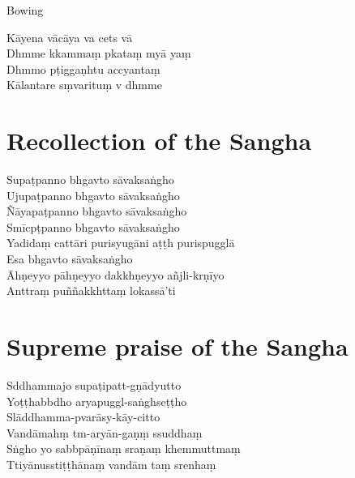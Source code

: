 \clearpage

\begin{instruction}%
  Bowing
\end{instruction}

Kāyena vācāya va cets vā\\
Dhmme kkammaṃ pkataṃ myā yaṃ\\
Dhmmo pṭiggaṇhtu accyantaṃ\\
Kālantare sṃvarituṃ v dhmme

\chapter{Recollection of the Sangha}%

\begin{leader}
\end{leader}

Supaṭpanno bhgavto sāvaksaṅgho\\
Ujupaṭpanno bhgavto sāvaksaṅgho\\
Ñāyapaṭpanno bhgavto sāvaksaṅgho\\
Smīcpṭpanno bhgavto sāvaksaṅgho\\
Yadidaṃ cattāri purisyugāni aṭṭh purispugglā\\
Esa bhgavto sāvaksaṅgho\\
Āhṇeyyo pāhṇeyyo dakkhṇeyyo añjli-krṇīyo\\
Anttraṃ puññakkhttaṃ lokassā'ti

\chapter{Supreme praise of the Sangha}%

\begin{leader}
\end{leader}

Sddhammajo supaṭipatt-gṇādyutto\\
Yoṭṭhabbdho aryapuggl-saṅghseṭṭho\\
Slāddhamma-pvarāsy-kāy-citto\\
Vandāmahṃ tm-aryān-gaṇṃ ssuddhaṃ\\
Sṅgho yo sabbpāṇīnaṃ sraṇaṃ khemmuttmaṃ\\
Ttiyānusstiṭṭhānaṃ vandām taṃ srenhaṃ

